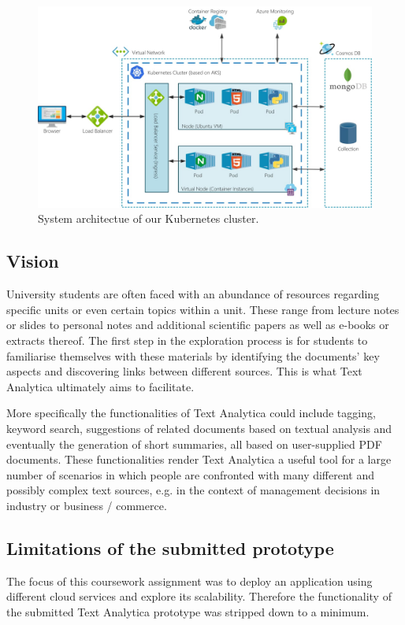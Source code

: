 \documentclass[conference]{IEEEtran}
\begin{document}
\begin{figure}[ht!]
\includegraphics[width=150mm]{img/architecture.jpeg}
\caption{System architectue of our Kubernetes cluster.}
\label{img:architecture}
\end{figure}

\subsection{Vision}
University students are often faced with an abundance of resources regarding specific units or even certain topics within a unit. These range from lecture notes or slides to personal notes and additional scientific papers as well as e-books or extracts thereof. The first step in the exploration process is for students to familiarise themselves with these materials by identifying the documents’ key aspects and discovering links between different sources. This is what Text Analytica ultimately aims to facilitate.

More specifically the functionalities of Text Analytica could include tagging, keyword search, suggestions of related documents based on textual analysis and eventually the generation of short summaries, all based on user-supplied PDF documents. These functionalities render Text Analytica a useful tool for a large number of scenarios in which people are confronted with many different and possibly complex text sources, e.g. in the context of management decisions in industry or business / commerce.

\subsection{Limitations of the submitted prototype}
The focus of this coursework assignment was to deploy an application using different cloud services and explore its scalability. Therefore the functionality of the submitted Text Analytica prototype was stripped down to a minimum.
\end{document}
